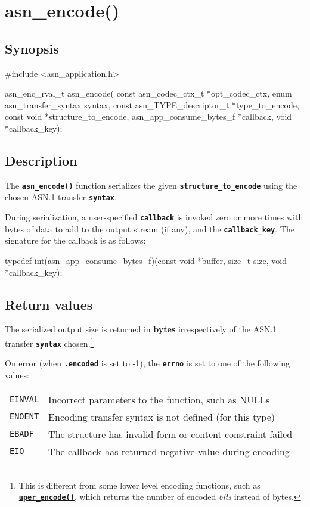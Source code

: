 \documentclass[english,oneside,12pt]{book}
\newcommand{\apisection}[2]{\clearpage\section{\label{#1}#2}}
\newcommand{\api}[2]{\hyperref[#1]{\code{#2}}}
\newcommand{\code}[1]{\texttt{\textbf{\lstinline{#1}}}}
\begin{document}
\apisection{sec:asn_encode}{asn\_encode()}

\subsection*{Synopsis}

\begin{signature}
#include <asn_application.h>

asn_enc_rval_t asn_encode(
    const asn_codec_ctx_t *opt_codec_ctx,
    enum asn_transfer_syntax syntax,
    const asn_TYPE_descriptor_t *type_to_encode,
    const void *structure_to_encode,
    asn_app_consume_bytes_f *callback, void *callback_key);
\end{signature}

\subsection*{Description}

The \code{asn_encode()} function serializes the given \code{structure_to_encode} using the chosen ASN.1 transfer \code{syntax}.

During serialization, a user-specified \code{callback} is invoked zero
or more times with bytes of data to add to the output stream (if any), and
the \code{callback_key}. The signature for the callback is as follows:

\begin{signature}
typedef int(asn_app_consume_bytes_f)(const void *buffer, size_t size, void *callback_key);
\end{signature}

\subsection*{Return values}


The serialized output size is returned in \textbf{bytes} irrespectively of the
ASN.1 transfer \code{syntax} chosen.\footnote{This is different from some
lower level encoding functions, such as \api{sec:uper_encode}{uper_encode()},
which returns the number of encoded \emph{bits} instead of bytes.}

On error (when \code{.encoded} is set to -1),
the \code{errno} is set to one of the following values:

\begin{tabular}[h!]{ll}
\texttt{EINVAL} & Incorrect parameters to the function, such as NULLs \\
\texttt{ENOENT} & Encoding transfer syntax is not defined (for this type) \\
\texttt{EBADF} & The structure has invalid form or content constraint failed \\
\texttt{EIO} & The callback has returned negative value during encoding
\end{tabular}
\end{document}
